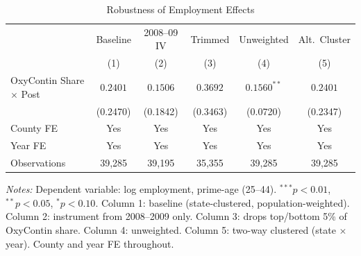 \begin{table}[t]
\centering
\caption{Robustness of Employment Effects}
\label{tab:robust}
\begin{threeparttable}
\begin{tabular}{lccccc}
\toprule
 & Baseline & 2008--09 IV & Trimmed & Unweighted & Alt.\ Cluster \\
 & (1) & (2) & (3) & (4) & (5) \\
\midrule
OxyContin Share $\times$ Post & $0.2401$ & $0.1506$ & $0.3692$ & $0.1560^{**}$ & $0.2401$ \\
 & (0.2470) & (0.1842) & (0.3463) & (0.0720) & (0.2347) \\
\midrule
County FE & Yes & Yes & Yes & Yes & Yes \\
Year FE & Yes & Yes & Yes & Yes & Yes \\
Observations & 39,285 & 39,195 & 35,355 & 39,285 & 39,285 \\
\bottomrule
\end{tabular}
\begin{tablenotes}[flushleft]
\footnotesize
\item \textit{Notes:} Dependent variable: log employment, prime-age (25--44). $^{***}p<0.01$, $^{**}p<0.05$, $^{*}p<0.10$. Column 1: baseline (state-clustered, population-weighted). Column 2: instrument from 2008--2009 only. Column 3: drops top/bottom 5\% of OxyContin share. Column 4: unweighted. Column 5: two-way clustered (state $\times$ year). County and year FE throughout.
\end{tablenotes}
\end{threeparttable}
\end{table}

